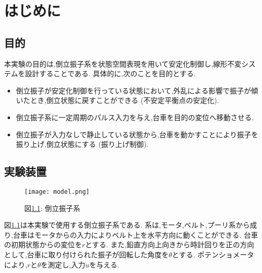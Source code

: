 \chapter{はじめに}
\section{目的}
本実験の目的は,倒立振子系を状態空間表現を用いて安定化制御し,線形不変システムを設計することである.
具体的に,次のことを目的とする.

\begin{itemize}
    \renewcommand{\labelenumi}{(\roman{enumi})}
    \item 倒立振子が安定化制御を行っている状態において,外乱による影響で振子が傾いたとき,倒立状態に戻すことができる (不安定平衡点の安定化).
    \item 倒立振子系に一定周期のパルス入力を与え,台車を目的の変位へ移動させる.
    \item 倒立振子が入力なしで静止している状態から,台車を動かすことにより振子を振り上げ,倒立状態にする (振り上げ制御).
\end{itemize}

\section{実験装置}

\begin{figure}[htbp]
    \begin{center}
        \texttt{[image: model.png]}
        \caption{図\ref{pendulum}: 倒立振子系}
        \label{pendulum}
    \end{center}
\end{figure}

図\ref{pendulum}は本実験で使用する倒立振子系である.
系は,モータ,ベルト,プーリ系から成り,台車はモータからの入力によりベルト上を水平方向に動くことができる.
台車の初期状態からの変位を$r$とする.
また,鉛直方向上向きから時計回りを正の方向として,台車に取り付けられた振子が回転した角度を$\theta$とする.
ポテンショメータにより,$r$と$\theta$を測定し,入力$u$を与える.

